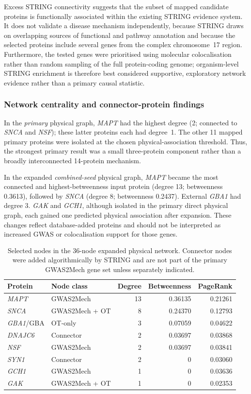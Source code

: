 \documentclass[11pt,a4paper]{article}
\begin{document}
Excess STRING connectivity suggests that the subset of mapped candidate proteins is functionally associated within the existing STRING evidence system. It does not validate a disease mechanism independently, because STRING draws on overlapping sources of functional and pathway annotation and because the selected proteins include several genes from the complex chromosome~17 region. Furthermore, the tested genes were prioritised using molecular colocalisation rather than random sampling of the full protein-coding genome; organism-level STRING enrichment is therefore best considered supportive, exploratory network evidence rather than a primary causal statistic.

\subsubsection{Network centrality and connector-protein findings}
In the \emph{primary} physical graph, \textit{MAPT} had the highest degree (2; connected to \textit{SNCA} and \textit{NSF}); these latter proteins each had degree~1. The other 11 mapped primary proteins were isolated at the chosen physical-association threshold. Thus, the strongest primary result was a small three-protein component rather than a broadly interconnected 14-protein mechanism.

In the expanded \emph{combined-seed} physical graph, \textit{MAPT} became the most connected and highest-betweenness input protein (degree 13; betweenness 0.3613), followed by \textit{SNCA} (degree 8; betweenness 0.2437). External \textit{GBA1} had degree 3. \textit{GAK} and \textit{GCH1}, although isolated in the primary direct physical graph, each gained one predicted physical association after expansion. These changes reflect database-added proteins and should not be interpreted as increased GWAS or colocalisation support for those genes.

\begin{table}[!htbp]
\centering\small
\caption{Selected nodes in the 36-node expanded physical network. Connector nodes were added algorithmically by STRING and are not part of the primary GWAS2Mech gene set unless separately indicated.}
\label{tab:step15_hubs}
\begin{tabular}{@{}llrrr@{}}
\toprule
Protein & Node class & Degree & Betweenness & PageRank \\\midrule
\textit{MAPT} & GWAS2Mech & 13 & 0.36135 & 0.21261 \\
\textit{SNCA} & GWAS2Mech + OT & 8 & 0.24370 & 0.12793 \\
\textit{GBA1}/GBA & OT-only & 3 & 0.07059 & 0.04622 \\
\textit{DNAJC6} & Connector & 2 & 0.03697 & 0.03868 \\
\textit{NSF} & GWAS2Mech & 2 & 0.03697 & 0.03841 \\
\textit{SYN1} & Connector & 2 & 0 & 0.03060 \\
\textit{GCH1} & GWAS2Mech & 1 & 0 & 0.03636 \\
\textit{GAK} & GWAS2Mech + OT & 1 & 0 & 0.02353 \\
\bottomrule
\end{tabular}
\end{table}
\end{document}
